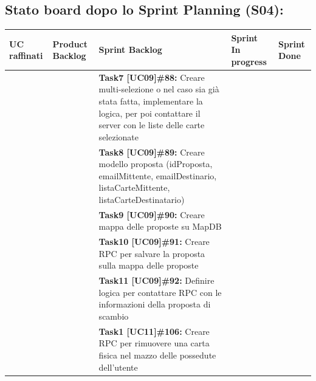 \documentclass[a4paper, oneside]{article}
\begin{document}
\begin{landscape}
        \subsection{Stato board dopo lo Sprint Planning (S04):}
        \small
        \def\arraystretch{2}%
        \begin{tabular}{ | p{4.5cm} | p{5.5cm} | p{5.2cm} | p{5.8cm} | p{2cm}| }
            \hline
            \textbf{UC raffinati}
            & \textbf{Product Backlog}
            & \textbf{Sprint Backlog}
            & \textbf{Sprint In progress}
            & \textbf{Sprint Done} \\
            \hline
            \hline
            & & \textbf{Task7 [UC09]\#88:} Creare multi-selezione o nel caso sia già stata fatta, implementare la logica, per poi contattare il server con le liste delle carte selezionate & & \\
            \hline
            & & \textbf{Task8 [UC09]\#89:} Creare modello proposta (idProposta, emailMittente, emailDestinario, listaCarteMittente, listaCarteDestinatario) & & \\
            \hline
            & & \textbf{Task9 [UC09]\#90:} Creare mappa delle proposte su MapDB & & \\
            \hline
            & & \textbf{Task10 [UC09]\#91:} Creare RPC per salvare la proposta sulla mappa delle proposte & & \\
            \hline
            & & \textbf{Task11 [UC09]\#92:} Definire logica per contattare RPC con le informazioni della proposta di scambio & & \\
            \hline
            & & \textbf{Task1 [UC11]\#106:}  Creare RPC per rimuovere una carta fisica nel mazzo delle possedute dell'utente & & \\
            \hline
        \end{tabular}

        \newpage
        \normalsize

\end{landscape}
\end{document}
